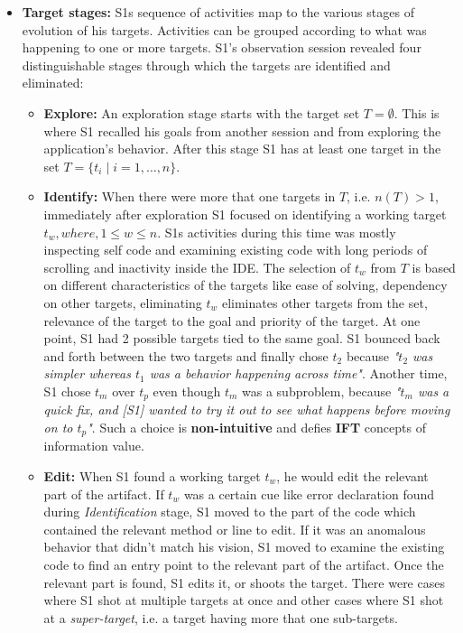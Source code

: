 \begin{itemize}
\item \textbf{Target stages:} S1\textquotesingle s sequence of activities map to the various stages of evolution of his targets. Activities can be grouped according to what was happening to one or more targets. S1's observation session revealed four distinguishable stages through which the targets are identified and eliminated:

\begin{itemize}
\item \textbf{Explore:} An exploration stage starts with the target set $T = \emptyset$. This is where S1 recalled his goals from another session and from exploring the application's behavior. After this stage S1 has at least one target in the set  $T=\{t_i \mid i={1,\dots,n}\}$. 
\vspace{5pt}
\item \textbf{Identify:} When there were more that one targets in $T$, i.e. $ n(T) > 1 $, immediately after exploration S1 focused on identifying a working target $t_w, where, 1 \leq w \leq n $. S1\textquotesingle s activities during this time was mostly inspecting self code and examining existing code with long periods of scrolling and inactivity inside the IDE. The selection of $t_w$ from $T$ is based on different characteristics of the targets like ease of solving, dependency on other targets, eliminating $t_w$ eliminates other targets from the set, relevance of the target to the goal and priority of the target. At one point, S1 had 2 possible targets tied to the same goal. S1 bounced back and forth between the two targets and finally chose $t_2$ because \textit{"$t_2$ was simpler whereas $t_1$ was a behavior happening across time"}. Another time, S1 chose $t_m$ over $t_p$ even though $t_m$ was a subproblem, because \textit{"$t_m$ was a quick fix, and [S1] wanted to try it out to see what happens before moving on to $t_p$"}. Such a choice is \textbf{non-intuitive} and defies \textbf{IFT} concepts of information value.
\vspace{5pt}
\item \textbf{Edit:} When S1 found a working target $t_w$, he would edit the relevant part of the artifact. If $t_w$ was a certain cue like error declaration found during \textit{Identification} stage, S1 moved to the part of the code which contained the relevant method or line to edit. If it was an anomalous behavior that didn't match his vision, S1 moved to examine the existing code to find an entry point to the relevant part of the artifact. Once the relevant part is found, S1 edits it, or shoots the target. There were cases where S1 shot at multiple targets at once and other cases where S1 shot at a \textit{super-target}, i.e. a target having more that one sub-targets.

\end{itemize}
\end{itemize}
